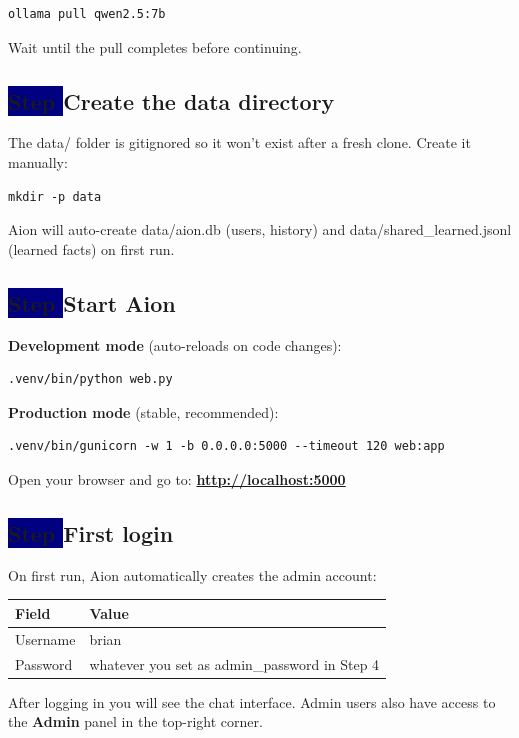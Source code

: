 \documentclass[11pt,a4paper]{article}
\newcommand{\code}[1]{{\ttfamily\small\color{navy}#1}}
\newcounter{step}
\newcommand{\step}[1]{%
  \stepcounter{step}%
  \subsection*{\colorbox{navy}{\color{white}\;\textbf{Step \thestep}\;}\quad #1}%
}
\begin{document}
\begin{lstlisting}
ollama pull qwen2.5:7b
\end{lstlisting}

Wait until the pull completes before continuing.

\step{Create the data directory}

The \code{data/} folder is gitignored so it won't exist after a fresh clone.
Create it manually:

\begin{lstlisting}
mkdir -p data
\end{lstlisting}

Aion will auto-create \code{data/aion.db} (users, history) and
\code{data/shared\_learned.jsonl} (learned facts) on first run.

\step{Start Aion}

\textbf{Development mode} (auto-reloads on code changes):
\begin{lstlisting}
.venv/bin/python web.py
\end{lstlisting}

\textbf{Production mode} (stable, recommended):
\begin{lstlisting}
.venv/bin/gunicorn -w 1 -b 0.0.0.0:5000 --timeout 120 web:app
\end{lstlisting}

Open your browser and go to: \quad \href{http://localhost:5000}{\textbf{http://localhost:5000}}

\step{First login}

On first run, Aion automatically creates the admin account:

\vspace{6pt}
\begin{tabularx}{0.5\linewidth}{M{2.8cm} X}
  \toprule
  \color{white}\textbf{Field} & \color{white}\textbf{Value} \\
  \midrule
   Username & \code{brian} \\
  Password & whatever you set as \code{admin\_password} in Step 4 \\
  \bottomrule
\end{tabularx}

\vspace{8pt}
After logging in you will see the chat interface. Admin users also have access
to the \textbf{Admin} panel in the top-right corner.

\end{document}
